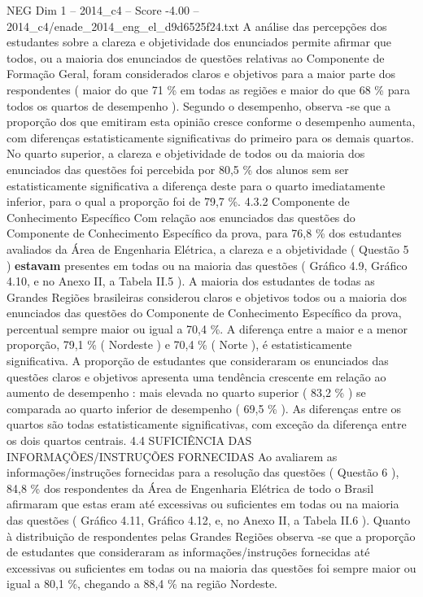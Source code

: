 \begin{textsample}{NEG Dim 1 – 2014\_c4 – Score -4.00 – 2014\_c4/enade\_2014\_eng\_el\_d9d6525f24.txt}
A análise das percepções dos estudantes sobre a clareza e objetividade dos enunciados permite afirmar que todos, ou a maioria dos enunciados de questões relativas ao Componente de Formação Geral, foram considerados claros e objetivos para a maior parte dos respondentes ( maior do que 71 \% em todas as regiões e maior do que 68 \% para todos os quartos de desempenho ).
Segundo o desempenho, observa -se que a proporção dos que emitiram esta opinião cresce conforme o desempenho aumenta, com diferenças estatisticamente significativas do primeiro para os demais quartos.
No quarto superior, a clareza e objetividade de todos ou da maioria dos enunciados das questões foi percebida por 80,5 \% dos alunos sem ser estatisticamente significativa a diferença deste para o quarto imediatamente inferior, para o qual a proporção foi de 79,7 \%. 4.3.2 Componente de Conhecimento Específico Com relação aos enunciados das questões do Componente de Conhecimento Específico da prova, para 76,8 \% dos estudantes avaliados da Área de Engenharia Elétrica, a clareza e a objetividade ( Questão 5 ) \textbf{estavam} presentes em todas ou na maioria das questões ( Gráfico 4.9, Gráfico 4.10, e no Anexo II, a Tabela II.5 ).
A maioria dos estudantes de todas as Grandes Regiões brasileiras considerou claros e objetivos todos ou a maioria dos enunciados das questões do Componente de Conhecimento Específico da prova, percentual sempre maior ou igual a 70,4 \%.
A diferença entre a maior e a menor proporção, 79,1 \% ( Nordeste ) e 70,4 \% ( Norte ), é estatisticamente significativa.
A proporção de estudantes que consideraram os enunciados das questões claros e objetivos apresenta uma tendência crescente em relação ao aumento de desempenho : mais elevada no quarto superior ( 83,2 \% ) se comparada ao quarto inferior de desempenho ( 69,5 \% ).
As diferenças entre os quartos são todas estatisticamente significativas, com exceção da diferença entre os dois quartos centrais. 4.4 SUFICIÊNCIA DAS INFORMAÇÕES/INSTRUÇÕES FORNECIDAS Ao avaliarem as informações/instruções fornecidas para a resolução das questões ( Questão 6 ), 84,8 \% dos respondentes da Área de Engenharia Elétrica de todo o Brasil afirmaram que estas eram até excessivas ou suficientes em todas ou na maioria das questões ( Gráfico 4.11, Gráfico 4.12, e, no Anexo II, a Tabela II.6 ).
Quanto à distribuição de respondentes pelas Grandes Regiões observa -se que a proporção de estudantes que consideraram as informações/instruções fornecidas até excessivas ou suficientes em todas ou na maioria das questões foi sempre maior ou igual a 80,1 \%, chegando a 88,4 \% na região Nordeste.

\end{textsample}
